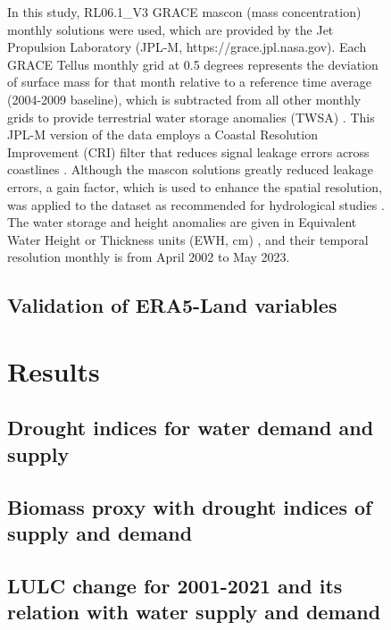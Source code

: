 \documentclass[
  number,
  preprint,
  3p]{elsarticle}
\begin{document}
\begin{figure}[!ht]
In this study, RL06.1\_V3 GRACE mascon (mass concentration) monthly
solutions were used, which are provided by the Jet Propulsion Laboratory
(JPL-M, https://grace.jpl.nasa.gov). Each GRACE Tellus monthly grid at
0.5 degrees represents the deviation of surface mass for that month
relative to a reference time average (2004-2009 baseline), which is
subtracted from all other monthly grids to provide terrestrial water
storage anomalies (TWSA) \citep{Ramjeawon2022, Yin2022}. This JPL-M
version of the data employs a Coastal Resolution Improvement (CRI)
filter that reduces signal leakage errors across coastlines
\citep{NASA2019, Wiese2016}. Although the mascon solutions greatly
reduced leakage errors, a gain factor, which is used to enhance the
spatial resolution, was applied to the dataset as recommended for
hydrological studies \citep{Ramjeawon2022, Yin2022}. The water storage
and height anomalies are given in Equivalent Water Height or Thickness
units (EWH, cm) \citep{Sabzehee2023}, and their temporal resolution
monthly is from April 2002 to May 2023.

\hypertarget{validation-of-era5-land-variables}{%
\subsection{Validation of ERA5-Land
variables}\label{validation-of-era5-land-variables}}

\hypertarget{results}{%
\section{Results}\label{results}}

\hypertarget{drought-indices-for-water-demand-and-supply-1}{%
\subsection{Drought indices for water demand and
supply}\label{drought-indices-for-water-demand-and-supply-1}}

\hypertarget{biomass-proxy-with-drought-indices-of-supply-and-demand}{%
\subsection{Biomass proxy with drought indices of supply and
demand}\label{biomass-proxy-with-drought-indices-of-supply-and-demand}}

\hypertarget{lulc-change-for-2001-2021-and-its-relation-with-water-supply-and-demand-1}{%
\subsection{LULC change for 2001-2021 and its relation with water supply
and
demand}\label{lulc-change-for-2001-2021-and-its-relation-with-water-supply-and-demand-1}}


\end{figure}
\end{document}
